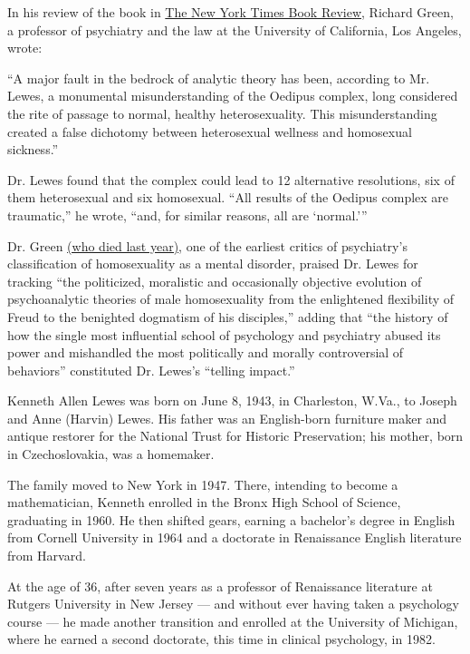 In his review of the book in
\href{https://www.nytimes3xbfgragh.onion/1988/12/11/books/navigating-the-straits-of-oedipus.html}{The
New York Times Book Review}, Richard Green, a professor of psychiatry
and the law at the University of California, Los Angeles, wrote:

``A major fault in the bedrock of analytic theory has been, according to
Mr. Lewes, a monumental misunderstanding of the Oedipus complex, long
considered the rite of passage to normal, healthy heterosexuality. This
misunderstanding created a false dichotomy between heterosexual wellness
and homosexual sickness.''

Dr. Lewes found that the complex could lead to 12 alternative
resolutions, six of them heterosexual and six homosexual. ``All results
of the Oedipus complex are traumatic,'' he wrote, ``and, for similar
reasons, all are `normal.'''

Dr. Green
\href{https://www.nytimes3xbfgragh.onion/2019/04/17/obituaries/dr-richard-green-dead.html}{(who
died last year)}, one of the earliest critics of psychiatry's
classification of homosexuality as a mental disorder, praised Dr. Lewes
for tracking ``the politicized, moralistic and occasionally objective
evolution of psychoanalytic theories of male homosexuality from the
enlightened flexibility of Freud to the benighted dogmatism of his
disciples,'' adding that ``the history of how the single most
influential school of psychology and psychiatry abused its power and
mishandled the most politically and morally controversial of behaviors''
constituted Dr. Lewes's ``telling impact.''

Kenneth Allen Lewes was born on June 8, 1943, in Charleston, W.Va., to
Joseph and Anne (Harvin) Lewes. His father was an English-born furniture
maker and antique restorer for the National Trust for Historic
Preservation; his mother, born in Czechoslovakia, was a homemaker.

The family moved to New York in 1947. There, intending to become a
mathematician, Kenneth enrolled in the Bronx High School of Science,
graduating in 1960. He then shifted gears, earning a bachelor's degree
in English from Cornell University in 1964 and a doctorate in
Renaissance English literature from Harvard.

At the age of 36, after seven years as a professor of Renaissance
literature at Rutgers University in New Jersey --- and without ever
having taken a psychology course --- he made another transition and
enrolled at the University of Michigan, where he earned a second
doctorate, this time in clinical psychology, in 1982.

